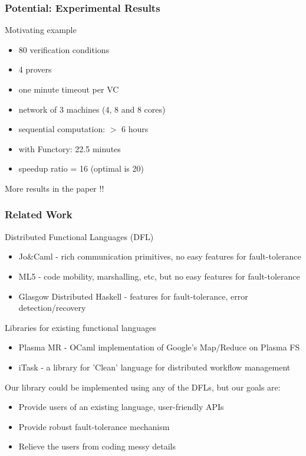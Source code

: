 \documentclass[xcolor=dvipsnames,8pt]{beamer}
\let\emph\alert
\begin{document}


\begin{frame}\frametitle {Potential: Experimental Results}
  Motivating example
  \begin{itemize}
  \item 80 verification conditions
  \item 4 provers
  \item one minute timeout per VC
  \item network of 3 machines (4, 8 and 8 cores)
  \end{itemize}


  \begin{itemize}
  \item sequential computation: \emph{$>$ 6 hours}
  \item with Functory: \emph{22.5 minutes}
  \item speedup ratio = \emph{16} (optimal is 20)
  \end{itemize}
  \begin{center}
  More results in the paper !!    
  \end{center}

\end{frame}


\begin{frame}\frametitle {Related Work}
  Distributed Functional Languages (DFL)
  \begin{itemize}
  \item Jo\&Caml - rich communication primitives, no easy features
    for fault-tolerance
  \item ML5 - code mobility, marshalling, etc, but no
    easy features for fault-tolerance
  \item Glasgow Distributed Haskell - features for fault-tolerance,
    error detection/recovery
  \end{itemize}
  Libraries for existing functional languages
  \begin{itemize}
  \item Plasma MR - OCaml implementation of Google's Map/Reduce on
    Plasma FS
  \item iTask - a library for 'Clean' language for distributed workflow management
  \end{itemize}

Our library could be implemented using any of the DFLs, but our goals
are:
\begin{itemize}
\item Provide users of an existing language, user-friendly APIs
\item Provide robust fault-tolerance mechanism 
\item Relieve the users from coding messy details
\end{itemize}
  
\end{frame}
\end{document}
